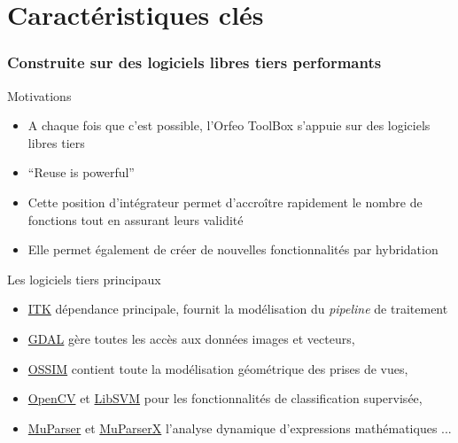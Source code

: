 \documentclass[8pt]{beamer}
\begin{document}
\section{Caractéristiques clés}

\begin{frame}
\frametitle{Construite sur des logiciels libres tiers performants}
\begin{block}{Motivations}
\begin{itemize}
\item A chaque fois que c'est possible, l'Orfeo ToolBox s'appuie sur des
  logiciels libres tiers
\item ``Reuse is powerful''
\item Cette position d'intégrateur permet d'accroître rapidement le nombre de fonctions tout en assurant leurs validité
\item Elle permet également de créer de nouvelles fonctionnalités par hybridation
\end{itemize} 
\end{block}

\begin{block}{Les logiciels tiers principaux}
\begin{itemize}
\item \href{www.itk.org}{ITK} dépendance principale, fournit la modélisation du \emph{pipeline} de traitement
\item \href{www.gdal.org}{GDAL} gère toutes les accès aux données images et vecteurs,
\item \href{www.ossim.org}{OSSIM} contient toute la modélisation géométrique des prises de vues, 
\item \href{www.opencv.org}{OpenCV} et \href{www.libsvm.org}{LibSVM} pour les fonctionnalités de classification supervisée,
\item \href{www.muparser.org}{MuParser} et \href{www.muparserx.org}{MuParserX} l'analyse dynamique d'expressions mathématiques ...
\end{itemize}
\end{block}


\end{frame}
\end{document}
